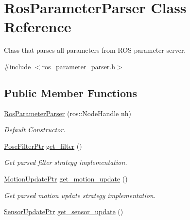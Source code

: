 \hypertarget{classRosParameterParser}{\section{Ros\-Parameter\-Parser Class Reference}
\label{classRosParameterParser}
}


Class that parses all parameters from R\-O\-S parameter server.  




{\ttfamily \#include $<$ros\-\_\-parameter\-\_\-parser.\-h$>$}

\subsection*{Public Member Functions}
\begin{DoxyCompactItemize}
\item 
\hypertarget{classRosParameterParser_aa1eaced586a61c482cc60e48d3da031a}{\hyperlink{classRosParameterParser_aa1eaced586a61c482cc60e48d3da031a}{Ros\-Parameter\-Parser} (ros\-::\-Node\-Handle nh)}\label{classRosParameterParser_aa1eaced586a61c482cc60e48d3da031a}

\begin{DoxyCompactList}\small\item\em Default Constructor. \end{DoxyCompactList}\item 
\hypertarget{classRosParameterParser_a06db85a3ac12b1fa6c2efd22a884d529}{\hyperlink{pose__filter_8h_a9df59d7c2f322f00bdd8eccab6d3fd73}{Pose\-Filter\-Ptr} \hyperlink{classRosParameterParser_a06db85a3ac12b1fa6c2efd22a884d529}{get\-\_\-filter} ()}\label{classRosParameterParser_a06db85a3ac12b1fa6c2efd22a884d529}

\begin{DoxyCompactList}\small\item\em Get parsed filter strategy implementation. \end{DoxyCompactList}\item 
\hypertarget{classRosParameterParser_a30f4b5a22749c66c26eb2b7854112d0d}{\hyperlink{motion__update_8h_aec1cf0d54c70c4dacac639ab488bf948}{Motion\-Update\-Ptr} \hyperlink{classRosParameterParser_a30f4b5a22749c66c26eb2b7854112d0d}{get\-\_\-motion\-\_\-update} ()}\label{classRosParameterParser_a30f4b5a22749c66c26eb2b7854112d0d}

\begin{DoxyCompactList}\small\item\em Get parsed motion update strategy implementation. \end{DoxyCompactList}\item 
\hypertarget{classRosParameterParser_aaf3ecb33630fecb04fc0088abb60e4c1}{\hyperlink{sensor__update_8h_a7bfe6ec1a05f2f99b0974d5cbd8b8b7b}{Sensor\-Update\-Ptr} \hyperlink{classRosParameterParser_aaf3ecb33630fecb04fc0088abb60e4c1}{get\-\_\-sensor\-\_\-update} ()}\label{classRosParameterParser_aaf3ecb33630fecb04fc0088abb60e4c1}


\end{DoxyCompactItemize}
